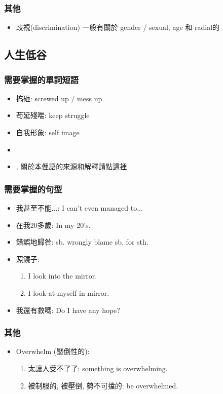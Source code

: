 \subsubsection*{其他}
\begin{itemize}
  \itemsep0em
  \item 歧視(discrimination) 一般有關於 gender / sexual, age 和 radial的
\end{itemize}

\subsection{人生低谷}
\subsubsection*{需要掌握的單詞短語}
\begin{itemize}
  \itemsep0em
  \item 搞砸: screwed up / mess up
  \item 苟延殘喘: keep struggle
  \item 自我形象: self image
  \item {}
  \item {}, 關於本俚語的來源和解釋請點\href{http://www.ept-xp.com/?ID=2204020903}{這裡}
\end{itemize}

\subsubsection*{需要掌握的句型}
\begin{itemize}
  \itemsep0em
  \item 我甚至不能...: I can't even managed to...
  \item 在我20多歲: In my 20's.
  \item 錯誤地歸咎: sb. wrongly blame sb. for sth.
  \item 照鏡子:
  \begin{enumerate}
    \itemsep0em
    \item I look into the mirror.
    \item I look at myself in mirror.
  \end{enumerate}
  \item 我還有救嗎: Do I have any hope?
\end{itemize}

\subsubsection*{其他}
\begin{itemize}
  \itemsep0em
  \item Overwhelm (壓倒性的):
  \begin{enumerate}
    \itemsep0em
    \item 太讓人受不了了: something is overwhelming.
    \item 被制服的, 被壓倒, 勢不可擋的: be overwhelmed.
  \end{enumerate}
\end{itemize}

